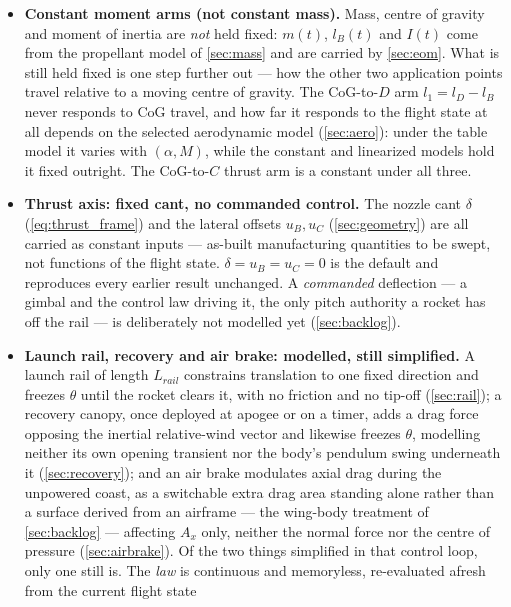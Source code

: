 \documentclass[10pt]{extarticle}
\numberwithin{equation}{subsection}
\begin{document}
\begin{itemize}
    rotating $\hat{z}_g$; the two corrections stay deliberately independent
    (\autoref{sec:noninertial}, closing caveat).
    \item \textbf{Constant moment arms (not constant mass).} Mass, centre of gravity and moment of
    inertia are \emph{not} held fixed: $m(t)$, $l_B(t)$ and $I(t)$ come from the propellant model
    of \autoref{sec:mass} and are carried by \autoref{sec:eom}. What is still held fixed is one
    step further out --- how the other two application points travel relative to a moving centre
    of gravity. The CoG-to-$D$ arm $l_1=l_D-l_B$ never responds to CoG travel, and how far it
    responds to the flight state at all depends on the selected aerodynamic model
    (\autoref{sec:aero}): under the table model it varies with $(\alpha,M)$, while the constant and
    linearized models hold it fixed outright. The CoG-to-$C$ thrust arm is a constant under all
    three.
    \item \textbf{Thrust axis: fixed cant, no commanded control.} The nozzle cant $\delta$
    (\autoref{eq:thrust_frame}) and the lateral offsets $u_B,u_C$ (\autoref{sec:geometry}) are all
    carried as constant inputs --- as-built manufacturing quantities to be swept, not functions of
    the flight state. $\delta=u_B=u_C=0$ is the default and reproduces every earlier result
    unchanged. A \emph{commanded} deflection --- a gimbal and the control law driving it, the
    only pitch authority a rocket has off the rail --- is deliberately not modelled yet
    (\autoref{sec:backlog}).
    \item \textbf{Launch rail, recovery and air brake: modelled, still simplified.} A launch rail
    of length $L_{rail}$ constrains translation to one fixed direction and freezes $\theta$ until
    the rocket clears it, with no friction and no tip-off (\autoref{sec:rail}); a recovery canopy,
    once deployed at apogee or on a timer, adds a drag force opposing the inertial relative-wind
    vector and likewise freezes $\theta$, modelling neither its own opening transient nor the
    body's pendulum swing underneath it (\autoref{sec:recovery}); and an air brake modulates axial
    drag during the unpowered coast, as a switchable extra drag area standing alone rather than a
    surface derived from an airframe --- the wing-body treatment of \autoref{sec:backlog} ---
    affecting $A_x$ only, neither the normal force nor the centre of pressure
    (\autoref{sec:airbrake}). Of the two things simplified in that control loop, only one still is.
    The \emph{law} is continuous and memoryless, re-evaluated afresh from the current flight state

\end{itemize}
\end{document}
